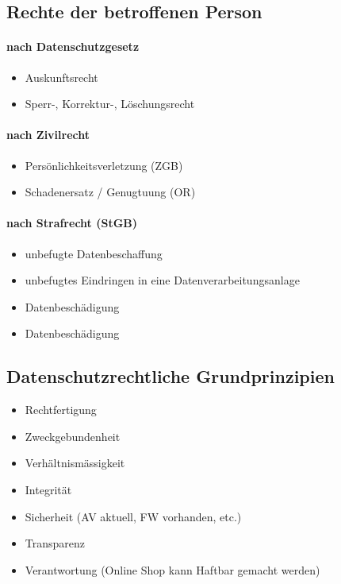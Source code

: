 \subsection{Rechte der betroffenen Person}
\begin{minipage}{0.5\linewidth}
    \paragraph{nach Datenschutzgesetz}
    \begin{itemize}
        \item Auskunftsrecht
        \item Sperr-, Korrektur-, Löschungsrecht
    \end{itemize}
    \paragraph{nach Zivilrecht}
    \begin{itemize}
        \item Persönlichkeitsverletzung (ZGB)
        \item Schadenersatz / Genugtuung (OR)
    \end{itemize}
\end{minipage}
\begin{minipage}{0.5\linewidth}
    \paragraph{nach Strafrecht (StGB)}
    \begin{itemize}
        \item unbefugte Datenbeschaffung
        \item unbefugtes Eindringen in eine Datenverarbeitungsanlage
        \item Datenbeschädigung
        \item Datenbeschädigung
    \end{itemize}
\end{minipage}

\subsection{Datenschutzrechtliche Grundprinzipien}
\begin{itemize}
    \item Rechtfertigung
    \item Zweckgebundenheit
    \item Verhältnismässigkeit
    \item Integrität
    \item Sicherheit (AV aktuell, FW vorhanden, etc.)
    \item Transparenz
    \item Verantwortung (Online Shop kann Haftbar gemacht werden)
\end{itemize}

